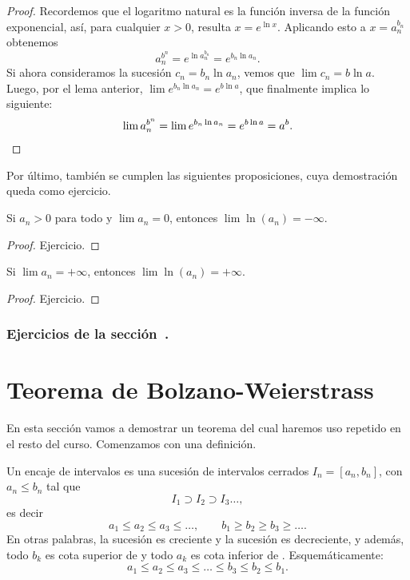 \begin{proof}
    Recordemos que el logaritmo natural es la función inversa de la función exponencial, así, para cualquier $x>0$, resulta $x = e^{\ln x}$. Aplicando esto a $x=a_n^{b_n}$ obtenemos
    \[
    a_n^{b^n} = e^{\ln a_n^{b_n }} = e^{b_n \ln a_n}.
    \]
    Si ahora consideramos la sucesión $c_n = b_n \ln a_n$, vemos que $\lim c_n = b \ln a$.
    Luego, por el lema anterior, $\lim e^{b_n \ln a_n} = e^{b \ln a} $, que finalmente implica lo siguiente:
    \[
    \lim a_n^{b^n} = \lim e^{b_n \ln a_n} = e^{b \ln a} = a^b. \qedhere
    \]
\end{proof}

Por último, también se cumplen las siguientes proposiciones, cuya demostración queda como ejercicio.

\begin{proposition}
    Si $a_n>0$ para todo \niN y $\lim a_n = 0$, entonces $\lim \ln(a_n) = -\infty$.
\end{proposition}
\begin{proof}
    Ejercicio.
\end{proof}

\begin{proposition}
    Si $\lim a_n = +\infty$, entonces $\lim \ln(a_n) = +\infty$.
\end{proposition}

\begin{proof}
    Ejercicio.
\end{proof}

\subsubsection*{Ejercicios de la sección~.}

\begin{enumerate}

\end{enumerate}


\section{Teorema de Bolzano-Weierstrass}

En esta sección vamos a demostrar un teorema del cual haremos uso repetido en el resto del curso. Comenzamos con una definición.

\begin{definition}
    Un encaje de intervalos es una sucesión de intervalos cerrados $I_n = [a_n,b_n]$, con $a_n\le b_n$ tal que 
    \[
    I_1 \supset I_2 \supset I_3 \dots,
    \]
    es decir
    \[
    a_1 \le a_2 \le a_3 \le \dots,
    \qquad
    b_1 \ge b_2 \ge b_3 \ge \dots.
    \]
    En otras palabras, la sucesión \sucan es creciente y la sucesión \sucbn es decreciente, y además, todo $b_k$ es cota superior de \sucan y todo $a_k$ es cota inferior de \sucbn. Esquemáticamente:
    \[
    a_1 \le a_2 \le a_3 \le \dots
    \le b_3 \le b_2 \le b_1.
    \]
\end{definition}

